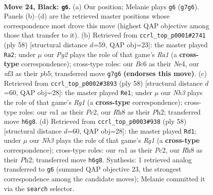 \documentclass[11pt]{article}
\begin{document}
\clearpage

\begin{figure}[p]\centering
\begin{subfigure}{0.46\textwidth}\centering
\resizebox{\linewidth}{!}{%
\newchessgame
\chessboard[
  setfen={4k2r/5ppp/P1b4n/4P2P/8/5NK1/1r4P1/RN5R b k - 0 24},
  showmover=false,
  pgfstyle=straightmove, color=movearrow, markmove={g7-g6}
]}
\caption{}
\end{subfigure}\hfill
\begin{subfigure}{0.46\textwidth}\centering
\resizebox{\linewidth}{!}{%
\newchessgame
\chessboard[
  setfen={2r3k1/5pp1/p6r/1p6/2nRN1P1/P4P2/4PK2/R7 w - - 5 30},
  showmover=false,
  pgfstyle=straightmove, color=movearrow, markmove={a1-a2}
]}
\caption{}
\end{subfigure}
\\[4pt]
\begin{subfigure}{0.46\textwidth}\centering
\resizebox{\linewidth}{!}{%
\newchessgame
\chessboard[
  setfen={1r3r1k/7p/6p1/Rp1B1p2/4n3/P7/1PP4P/1K4R1 w - - 0 30},
  showmover=false,
  pgfstyle=straightmove, color=movearrow, markmove={g1-e1}
]}
\caption{}
\end{subfigure}\hfill
\begin{subfigure}{0.46\textwidth}\centering
\resizebox{\linewidth}{!}{%
\newchessgame
\chessboard[
  setfen={1r3r1k/7p/6p1/Rp1B1p2/4n3/P7/1PP4P/1K4R1 w - - 0 30},
  showmover=false,
  pgfstyle=straightmove, color=movearrow, markmove={g1-d1}
]}
\caption{}
\end{subfigure}
\caption{\textbf{Move 24, Black: \texttt{g6}.} (a) Our position; Melanie plays \texttt{g6} (\texttt{g7g6}). Panels (b)--(d) are the retrieved master positions whose correspondence most drove this move (highest QAP objective among those that transfer to it). (b) Retrieved from \texttt{ccrl\_top\_p0001\#2741} (ply 58) [structural distance $d$=59, QAP obj=23]: the master played \texttt{Ra2}; under $\mu$ our \emph{Pg2} plays the role of that game's \emph{Ra1} (a \textbf{cross-type} correspondence); cross-type roles: our \emph{B}c6 as their \emph{N}e4, our \emph{n}f3 as their \emph{p}b5; transferred move \texttt{g7g6} \textbf{(endorses this move)}. (c) Retrieved from \texttt{ccrl\_top\_p0002\#3893} (ply 58) [structural distance $d$=60, QAP obj=28]: the master played \texttt{Re1}; under $\mu$ our \emph{Nh3} plays the role of that game's \emph{Rg1} (a \textbf{cross-type} correspondence); cross-type roles: our \emph{r}a1 as their \emph{P}c2, our \emph{R}h8 as their \emph{P}h2; transferred move \texttt{h6g8}. (d) Retrieved from \texttt{ccrl\_top\_p0003\#938} (ply 58) [structural distance $d$=60, QAP obj=28]: the master played \texttt{Rd1}; under $\mu$ our \emph{Nh3} plays the role of that game's \emph{Rg1} (a \textbf{cross-type} correspondence); cross-type roles: our \emph{r}a1 as their \emph{P}c2, our \emph{R}h8 as their \emph{P}h2; transferred move \texttt{h6g8}. Synthesis: 1 retrieved analog transferred to \texttt{g6} (summed QAP objective 23, the strongest correspondence among the candidate moves); Melanie committed it via the \texttt{search} selector.}
\label{fig:thought-m47}
\end{figure}
\end{document}
